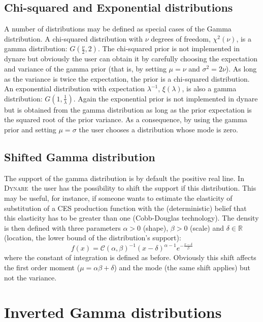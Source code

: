 \documentclass{amsart}
\theoremstyle{plain}
\theoremstyle{remark}
\numberwithin{equation}{section}
\newcommand{\Dynare}{\textsc{Dynare}}
\begin{document}
 \subsection{Chi-squared and Exponential distributions}\label{subsec:ChiAndExponentialDistributions}
 A number of distributions may be defined as special cases of the
 Gamma distribution. A chi-squared distribution with $\nu$ degrees of
 freedom, $\chi^2(\nu)$, is a gamma distribution:
 $G\left(\frac{\nu}{2},2\right)$. The chi-squared prior is not
 implemented in dynare but obviously the user can obtain it by
 carefully choosing the expectation and variance of the gamma prior
 (that is, by setting $\mu=\nu$ and $\sigma^2 = 2\nu$). As long as the
 variance is twice the expectation, the prior is a chi-squared
 distribution. An exponential distribution with expectation
 $\lambda^{-1}$, $\xi(\lambda)$, is also a gamma distribution:
 $G\left(1,\frac{1}{\lambda}\right)$. Again the exponential prior is
 not implemented in dynare but is obtained from the gamma distribution
 as long as the prior expectation is the squared root of the prior
 variance. As a consequence, by using the gamma prior and setting
 $\mu=\sigma$ the user chooses a distribution whose mode is zero.

 \subsection{Shifted Gamma distribution}\label{subsec:ShiftedGammaDistribution}
 The support of the gamma distribution is by default the positive real
 line. In \Dynare\ the user has the possibility to shift the support
 if this distribution. This may be useful, for instance, if someone
 wants to estimate the elasticity of substitution of a CES production
 function with the (deterministic) belief that this elasticity has to
 be greater than one (Cobb-Douglas technology). The density is then
 defined with three parameters $\alpha>0$ (shape), $\beta>0$ (scale)
 and $\delta\in\mathbb R$ (location, the lower bound of the
 distribution’s support):
 \[
   f(x) = \mathcal C(\alpha, \beta)^{-1}(x-\delta)^{\alpha-1}e^{-\frac{x-\delta}{\beta}}
 \]
 where the constant of integration is defined as before. Obviously
 this shift affects the first order moment ($\mu=\alpha\beta+\delta$)
 and the mode (the same shift applies) but not the variance.\newline

\section{Inverted Gamma distributions}\label{sec:InvertedGammaDistributions}
\end{document}
